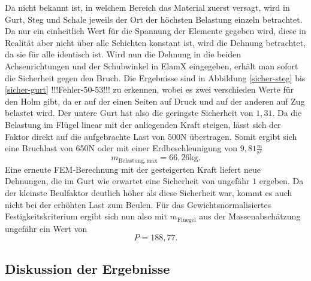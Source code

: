 Da nicht bekannt ist, in welchem Bereich das Material zuerst versagt, wird in Gurt, Steg und Schale jeweils der Ort der höchsten Belastung einzeln betrachtet. Da nur ein einheitlich Wert für die Spannung der Elemente gegeben wird, diese in Realität aber nicht über alle Schichten konstant ist, wird die Dehnung betrachtet, da sie für alle identisch ist. Wird nun die Dehnung in die beiden Achsenrichtungen und der Schubwinkel in ElamX eingegeben, erhält man sofort die Sicherheit gegen den Bruch. Die Ergebnisse sind in Abbildung \ref{sicher-steg} bis \ref{sicher-gurt} !!!Fehler-50-53!!! zu erkennen, wobei es zwei verschieden Werte für den Holm gibt, da er auf der einen Seiten auf Druck und auf der anderen auf Zug belastet wird. Der untere Gurt hat also die geringste Sicherheit von $1,31$. Da die Belastung im Flügel linear mit der anliegenden Kraft steigen, lässt sich der Faktor direkt auf die aufgebrachte Last von $500\mathrm{N}$ übertragen. Somit ergibt sich eine Bruchlast von 650N oder mit einer Erdbeschleunigung von $9,81\frac{\mathrm{m}}{\mathrm{s^2}}$
$$m_{\mathrm{Belastung,max}} = 66,26\mathrm{kg}. $$ Eine erneute FEM-Berechnung mit der gesteigerten Kraft liefert neue Dehnungen, die im Gurt wie erwartet eine Sicherheit von ungefähr $1$ ergeben. Da der kleinste Beulfaktor deutlich höher als diese Sicherheit war, kommt es auch nicht bei der erhöhten Last zum Beulen.
Für das Gewichtsnormalisiertes Festigkeitskriterium ergibt sich nun also mit $m_{\mathrm{Fluegel}}$ aus der Massenabschätzung ungefähr ein Wert von
$$P = 188,77.$$
\subsection{Diskussion der Ergebnisse}
